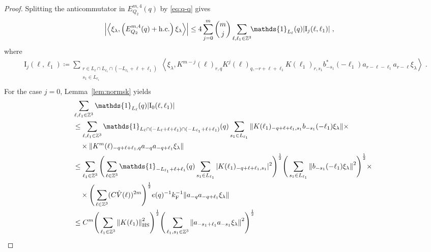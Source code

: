 \documentclass[12pt,a4paper]{article}
\numberwithin{equation}{section}
\newcommand{\1}{\mathbb{I}}
\newcommand{\F}{\mathrm{F}}
\newcommand{\HS}{\mathrm{HS}}
\newcommand{\I}{\mathrm{I}}
\newcommand{\Zstar}{\mathbb{Z}^3} %
\newcommand{\Z}{\mathbb{Z}}
\newcommand{\half}{\frac{1}{2}}
\newcommand{\eva}[1]{\left\langle #1 \right\rangle}
\theoremstyle{plain}
\theoremstyle{definition}
\theoremstyle{remark}
\theoremstyle{plain}
\theoremstyle{definition}
\theoremstyle{remark}
\begin{document}
\begin{proof}
Splitting the anticommutator in $ E^{m,4}_{Q_2}(q) $ by \eqref{eq:q-q} gives
\begin{equation} \label{eq:EQ2171}
\begin{aligned}
	& \abs{\eva{\xi_\lambda,\left(E^{m,4}_{Q_2}(q) + \mathrm{h.c.}\right) \xi_\lambda }}
	\le 4 \sum_{j=0}^m {{m}\choose j} \sum_{\ell,\ell_1 \in \Zstar}\!\! \mathds{1}_{L_\ell}(q) |\I_j(\ell, \ell_1)| \;,
	\end{aligned}
\end{equation}
where
\begin{equation}
\begin{aligned}
	& \I_j(\ell, \ell_1)
	\coloneq \sum_{\substack{r\in L_{\ell} \cap L_{\ell_1} \cap (-L_{\ell_1}+\ell+\ell_1)\\ s_1 \in L_{\ell_1}}} \!\!
		\eva{\xi_\lambda, K^{m-j}(\ell)_{r,q} K^{j}(\ell)_{q,-r+\ell+\ell_1} K(\ell_1)_{r,s_1} b^*_{-s_1}(-\ell_1) a_{r-\ell-\ell_1} a_{r-\ell} \xi_\lambda} \;. \\
\end{aligned}
\end{equation}
For the case $ j = 0 $, Lemma~\ref{lem:normsk} yields
\begin{align}
	&\sum_{\ell,\ell_1 \in \Zstar} \mathds{1}_{L_\ell}(q) |\I_0(\ell, \ell_1)| \nonumber\\
	&\leq \sum_{\ell,\ell_1 \in \Zstar} \mathds{1}_{L_\ell \cap (-L_\ell + \ell + \ell_1) \cap (-L_{\ell_1} + \ell + \ell_1)}(q) \sum\limits_{s_1 \in L_{\ell_1}}
		\norm{K(\ell_1)_{-q+\ell+\ell_1,s_1} b_{-s_1}(-\ell_1)  \xi_\lambda} \times \nonumber\\
	&\quad \times \norm{ K^m(\ell)_{-q+\ell+\ell_1,q}a_{-q}a_{-q+\ell_1}  \xi_\lambda } \nonumber\\
	&\leq \sum_{\ell_1 \in \Zstar}
		\Bigg( \sum_{\ell \in \Zstar} \mathds{1}_{-L_{\ell_1} + \ell + \ell_1}(q) \sum\limits_{s_1 \in L_{\ell_1}} |K(\ell_1)_{-q+\ell+\ell_1,s_1}|^2 \Bigg)^{\half}
		\Bigg( \sum\limits_{s_1 \in L_{\ell_1}} \norm{ b_{-s_1}(-\ell_1)  \xi_\lambda}^2 \Bigg)^{\half} \times \nonumber\\
	&\quad \times \Bigg( \sum_{\ell \in \Zstar} (C \hat{V}(\ell))^{2m} \Bigg)^{\half}
		e(q)^{-1} k_{\F}^{-1}
		\norm{a_{-q}a_{-q+\ell_1}  \xi_\lambda } \nonumber\\
	&\leq C^m \Bigg( \sum_{\ell_1 \in \Zstar}
		\norm{K(\ell_1)}_{\HS}^2 \Bigg)^{\half}
		\Bigg( \sum_{\ell_1,s_1 \in \Z^3} \norm{a_{-s_1+\ell_1} a_{-s_1} \xi_\lambda}^2 \Bigg)^{\frac 12}

\end{align}
\end{proof}
\end{document}
